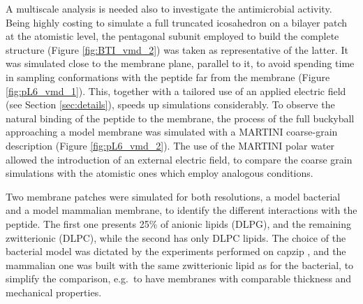 A multiscale analysis is needed also to investigate the antimicrobial activity. Being highly costing to simulate a full truncated icosahedron on a bilayer patch at the atomistic level, the pentagonal subunit employed to build the complete structure (Figure \ref{fig:BTI_vmd_2}) was taken as representative of the latter. It was simulated close to the membrane plane, parallel to it, to avoid spending time in sampling conformations with the peptide far from the membrane (Figure \ref{fig:pL6_vmd_1}). This, together with a tailored use of an applied electric field (see Section \ref{sec:details}), speeds up simulations considerably.
%
To observe the natural binding of the peptide to the membrane, the process of the full buckyball approaching a model membrane was simulated with a MARTINI coarse-grain description (Figure \ref{fig:pL6_vmd_2}). The use of the MARTINI polar water\citep{Yesylevskyy2010} allowed the introduction of an external electric field, to compare the coarse grain simulations with the atomistic ones which employ analogous conditions.

Two membrane patches were simulated for both resolutions, a model bacterial and a model mammalian membrane, to identify the different interactions with the peptide. The first one presents 25\% of anionic lipids (DLPG), and the remaining zwitterionic (DLPC), while the second has only DLPC lipids. The choice of the bacterial model was dictated by the experiments performed on capzip \citep{Castelletto2016}, and the mammalian one was built with the same zwitterionic lipid as for the bacterial, to simplify the comparison, e.g.\ to have membranes with comparable thickness and mechanical properties.

